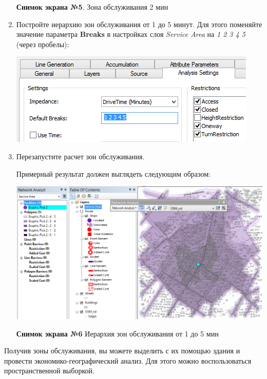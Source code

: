 \documentclass[12pt,]{book}
\begin{document}
\begin{enumerate}
  \textbf{Снимок экрана №5}. Зона обслуживания 2 мин
\item
  Постройте иерархию зон обслуживания от 1 до 5 минут. Для этого поменяйте значение параметра \textbf{Breaks} в настройках слоя \emph{Service Area} на \emph{1 2 3 4 5} (через пробелы):

  \includegraphics{images/Ex12/image16.png}
\item
  Перезапустите расчет зон обслуживания.

  Примерный результат должен выглядеть следующим образом:

  \includegraphics{images/Ex12/image17.png}

  \textbf{Снимок экрана №6} Иерархия зон обслуживания от 1 до 5 мин
\end{enumerate}

Получив зоны обслуживания, вы можете выделить с их помощью здания и провести экономико-географический анализ. Для этого можно воспользоваться пространственной выборкой.
\end{document}
